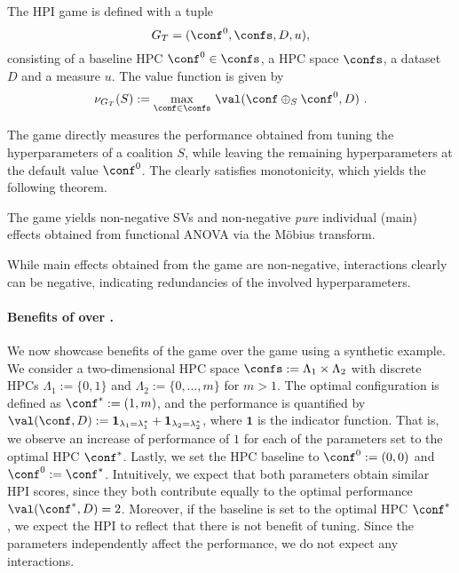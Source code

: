 \begin{definition}\label{def:tunability}
The \tunability HPI game is defined with a tuple 
\[
G_T = (\conf^0, \confs, D, u),
\]
consisting of a baseline HPC $\conf^0 \in \confs$, a HPC space $\confs$, a dataset $D$ and a measure $u$. The value function is given by
\[
\nu_{G_T}(S) := \max_{\conf \in \confs}
\,\val(\conf \oplus_S \conf^0, D) \,\, .
\]
\end{definition}

The \tunability game directly measures the performance obtained from tuning the hyperparameters of a coalition $S$, while leaving the remaining hyperparameters at the default value $\conf^0$.
The \tunability clearly satisfies monotonicity, which yields the following theorem.

\begin{theorem}
    The \tunability game yields non-negative \glspl*{SV} and non-negative \emph{pure} individual (main) effects obtained from functional ANOVA via the Möbius transform.
\end{theorem}

While main effects obtained from the \tunability game are non-negative, interactions clearly can be negative, indicating redundancies of the involved hyperparameters.

\paragraph{Benefits of \tunability over \sensitivity.}
We now showcase benefits of the \tunability game over the \sensitivity game using a synthetic example.
We consider a two-dimensional HPC space $\confs := \Lambda_1 \times \Lambda_2$ with discrete HPCs $\Lambda_1 := \{0,1\}$ and $\Lambda_2:= \{0,\dots,m\}$ for $m > 1$.
The optimal configuration is defined as $\conf^\ast := (1,m)$, and the performance is quantified by $\val(\conf,D) := \mathbf{1}_{\lambda_1=\lambda_1^\ast}+\mathbf{1}_{\lambda_2 = \lambda^\ast_2}$, where $\mathbf{1}$ is the indicator function.
That is, we observe an increase of performance of $1$ for each of the parameters set to the optimal HPC $\conf^\ast$.
Lastly, we set the HPC baseline to $\conf^0 := (0,0)$ and $\conf^0 := \conf^\ast$.
Intuitively, we expect that both parameters obtain similar HPI scores, since they both contribute equally to the optimal performance $\val(\conf^\ast,D) = 2$.
Moreover, if the baseline is set to the optimal HPC $\conf^\ast$, we expect the HPI to reflect that there is not benefit of tuning.
Since the parameters independently affect the performance, we do not expect any interactions.

